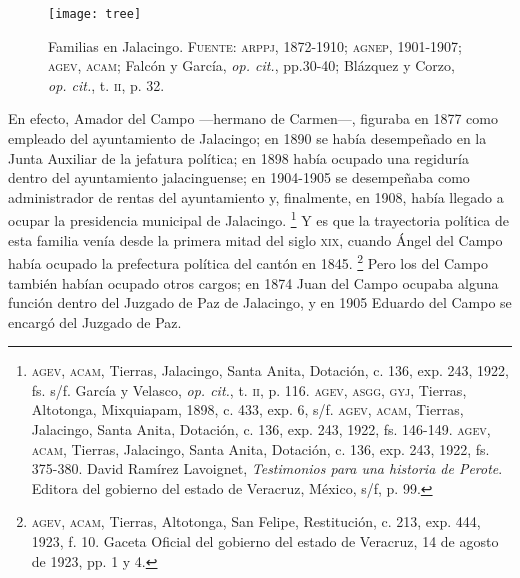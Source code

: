 \documentclass[14pt,twoside,final]{extbook} %
\let\oldfootnote\footnote
\renewcommand\footnote[1]{%
\oldfootnote{\hspace{1mm}#1}}
\begin{document}
\begin{sidewaysfigure}
\centering
\texttt{[image: tree]}
\caption[Familias en Jalacingo]{Familias en Jalacingo. \textsc{Fuente:} \textsc{arppj, 1872-1910}; \textsc{agnep}, 1901-1907; \textsc{agev, acam}; Falcón y García, \emph{op. cit.}, pp.30-40; Blázquez y Corzo, \emph{op. cit.}, t. \textsc{ii}, p. 32.}
\label{fig:arbol-genealogico}
\end{sidewaysfigure}
En efecto, Amador del Campo ---hermano de Carmen---, figuraba en 1877 como empleado del ayuntamiento de Jalacingo; en 1890 se había desempeñado en la Junta Auxiliar de la jefatura política; en 1898 había ocupado una regiduría dentro del ayuntamiento jalacinguense; en 1904-1905 se desempeñaba como administrador de rentas del ayuntamiento y, finalmente, en 1908, había llegado a ocupar la presidencia municipal de Jalacingo.\footnote{\textsc{agev, acam}, Tierras, Jalacingo, Santa Anita, Dotación, c. 136, exp. 243, 1922, fs. s/f. García y Velasco, \emph{op. cit.}, t. \textsc{ii}, p. 116. \textsc{agev, asgg, gyj}, Tierras, Altotonga, Mixquiapam, 1898, c. 433, exp. 6, s/f. \textsc{agev, acam}, Tierras, Jalacingo, Santa Anita, Dotación, c. 136, exp. 243, 1922, fs. 146-149. \textsc{agev, acam}, Tierras, Jalacingo, Santa Anita, Dotación, c. 136, exp. 243, 1922, fs. 375-380. David Ramírez Lavoignet, \emph{Testimonios para una historia de Perote}. Editora del gobierno del estado de Veracruz, México, s/f, p. 99.} Y es que la trayectoria política de esta familia venía desde la primera mitad del siglo \textsc{xix}, cuando Ángel del Campo había ocupado la prefectura política del cantón en 1845.\footnote{\textsc{agev, acam}, Tierras, Altotonga, San Felipe, Restitución, c. 213, exp. 444, 1923, f. 10. Gaceta Oficial del gobierno del estado de Veracruz, 14 de agosto de 1923, pp. 1 y 4.} Pero los del Campo también habían ocupado otros cargos; en 1874 Juan del Campo ocupaba alguna función dentro del Juzgado de Paz de Jalacingo, y en 1905 Eduardo del Campo se encargó del Juzgado de Paz.
\end{document}
